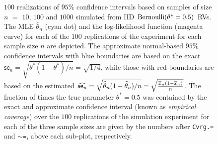 \begin{figure}[htbp]
\caption{{\small $100$ realizations of $95\%$ confidence intervals based on samples of size $n$ $=$ $10$, $100$ and $1000$ simulated from IID $\mbox{{\rm Bernoulli}}(\theta^*=0.5)$ RVs.  %
The MLE $\widehat{\theta}_n$ (cyan dot) and the log-likelihood function (magenta curve) for each of the $100$ replications of the experiment for each sample size $n$ are depicted.  
The approximate normal-based $95\%$ confidence intervals with blue boundaries are based on the exact $\mathsf{se}_n=\sqrt{\theta^*(1-\theta^*)/n}=\sqrt{1/4}$, while those with red boundaries are based on the estimated $\widehat{\mathsf{se}_n}=\sqrt{\widehat{\theta}_n(1-\widehat{\theta}_n)/n} = \sqrt{\frac{\overline{x}_n(1-\overline{x}_n)}{n}}$.  
The fraction of times the true parameter $\theta^*=0.5$ was contained by the exact and approximate confidence interval (known as {\em empirical coverage}) over the $100$ replications of the simulation experiment for each of the three sample sizes are given by the numbers after {\tt Cvrg.=} and {\tt $\sim$=}, above each sub-plot, respectively.}\label{F:BernoulliMLEConsistency}}
\begin{center}
\end{center}
\end{figure}  

\clearpage

%
%

